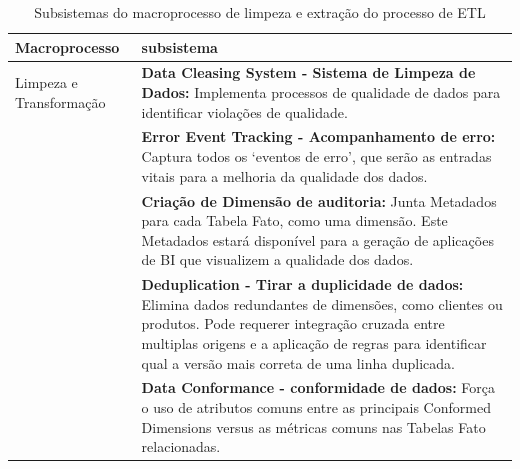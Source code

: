 \begin{table}[h]
	\centering
	\caption{Subsistemas do macroprocesso de limpeza e extração do processo de ETL}
	\label{sublimpeza}
	\begin{tabular}{|p{3cm}| p{11cm} |}
		\hline
		Macroprocesso & subsistema\\
		\hline
		Limpeza e Transformação &  \textbf{Data Cleasing System - Sistema de Limpeza de Dados:}  Implementa processos de qualidade de dados para identificar violações de qualidade.\\
		& \textbf{Error Event Tracking - Acompanhamento de erro:} Captura todos os ‘eventos de erro’, que serão as entradas vitais para a melhoria da qualidade dos dados.\\
		& \textbf{Criação de Dimensão de auditoria:} Junta Metadados para cada Tabela Fato, como uma dimensão. Este Metadados estará disponível para a geração de aplicações de BI que visualizem  a qualidade dos dados.\\
		& \textbf{Deduplication - Tirar a duplicidade de dados:} Elimina dados redundantes de dimensões, como clientes ou produtos. Pode requerer integração cruzada entre multiplas origens e a aplicação de regras para identificar qual a versão mais correta de uma linha duplicada.\\
		& \textbf{Data Conformance - conformidade de dados:} Força o uso de atributos comuns entre as principais Conformed Dimensions versus as métricas comuns nas Tabelas Fato relacionadas.\\
		\hline
		
	\end{tabular}
\end{table}

\clearpage


